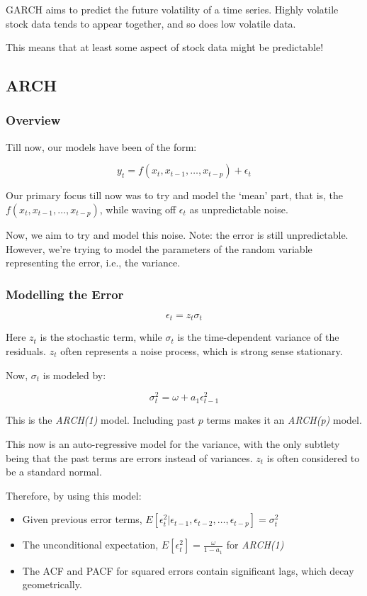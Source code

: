 GARCH aims to predict the future volatility of a time series. Highly volatile stock data tends to appear together, and so does low volatile data.

This means that at least some aspect of stock data might be predictable!

\subsection{ARCH}

\subsubsection{Overview}

Till now, our models have been of the form:

\[
y_t = f(x_t, x_{t-1}, \dots, x_{t-p}) + \epsilon_t
\]

Our primary focus till now was to try and model the ‘mean’ part, that is, the $f(x_t, x_{t-1}, \dots, x_{t-p})$, while waving off $\epsilon_t$ as unpredictable noise.

Now, we aim to try and model this noise. Note: the error is still unpredictable. However, we’re trying to model the parameters of the random variable representing the error, i.e., the variance.

\subsubsection{Modelling the Error}

\[
\epsilon_t = z_t \sigma_t
\]

Here $z_t$ is the stochastic term, while $\sigma_t$ is the time-dependent variance of the residuals. $z_t$ often represents a noise process, which is strong sense stationary.

Now, $\sigma_t$ is modeled by:

\[
\sigma^2_t = \omega + a_1 \epsilon^2_{t-1}
\]

This is the \emph{ARCH(1)} model. Including past $p$ terms makes it an \emph{ARCH(p)} model.

This now is an auto-regressive model for the variance, with the only subtlety being that the past terms are errors instead of variances. $z_t$ is often considered to be a standard normal. 

Therefore, by using this model:
\begin{itemize}
  \item Given previous error terms, $E[\epsilon^2_t|\epsilon_{t-1}, \epsilon_{t-2}, \dots, \epsilon_{t-p}] = \sigma^2_t$
  \item The unconditional expectation, $E[\epsilon^2_t] = \frac{\omega}{1 - a_1}$ for \emph{ARCH(1)}
  \item The ACF and PACF for squared errors contain significant lags, which decay geometrically.
\end{itemize}

